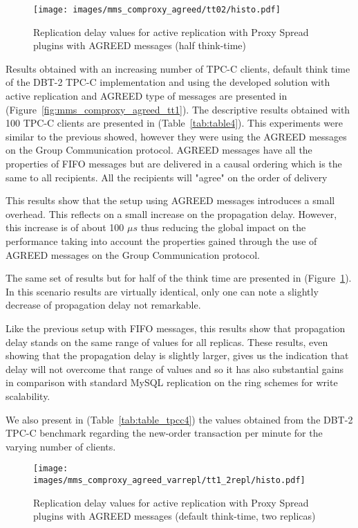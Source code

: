 \clearpage

\begin{figure}[h!]
\centering    
\texttt{[image: images/mms\_comproxy\_agreed/tt02/histo.pdf]}
\caption{Replication delay values for active replication with Proxy Spread plugins with AGREED messages (half think-time)}
\label{fig:mms_comproxy_agreed_tt02}
\end{figure}


Results obtained with an increasing number of TPC-C clients, default think time of the DBT-2 TPC-C implementation and using the developed solution with active replication and AGREED type of messages are presented in (Figure~\ref{fig:mms_comproxy_agreed_tt1}). The descriptive results obtained with 100 TPC-C clients are presented in (Table~\ref{tab:table4}). This experiments were similar to the previous showed, however they were using the AGREED messages on the Group Communication protocol. AGREED messages have all the properties of FIFO messages but are delivered in a causal ordering which is the same to all recipients. All the recipients will "agree" on the order of delivery

This results show that the setup using AGREED messages introduces a small overhead. This reflects on a small increase on the propagation delay. However, this increase is of about 100 $\mu{}s$ thus reducing the global impact on the performance taking into account the properties gained through the use of AGREED messages on the Group Communication protocol.  



The same set of results but for half of the think time are presented in (Figure~\ref{fig:mms_comproxy_agreed_tt02}). In this scenario results are virtually identical, only one can note a slightly decrease of propagation delay not remarkable.

Like the previous setup with FIFO messages, this results show that propagation delay stands on the same range of values for all replicas. These results, even showing that the propagation delay is slightly larger, gives us the indication that delay will not overcome that range of values and so it has also substantial gains in comparison with standard MySQL replication on the ring schemes for write scalability.

We also present in (Table~\ref{tab:table_tpcc4}) the values obtained from the DBT-2 TPC-C benchmark regarding the new-order transaction per minute for the varying number of clients.

\begin{figure}[h!]
\centering    
\texttt{[image: images/mms\_comproxy\_agreed\_varrepl/tt1\_2repl/histo.pdf]}
\caption{Replication delay values for active replication with Proxy Spread plugins with AGREED messages (default think-time, two replicas)}
\label{fig:mms_comproxy_agreed_2repl_tt1}
\end{figure}

